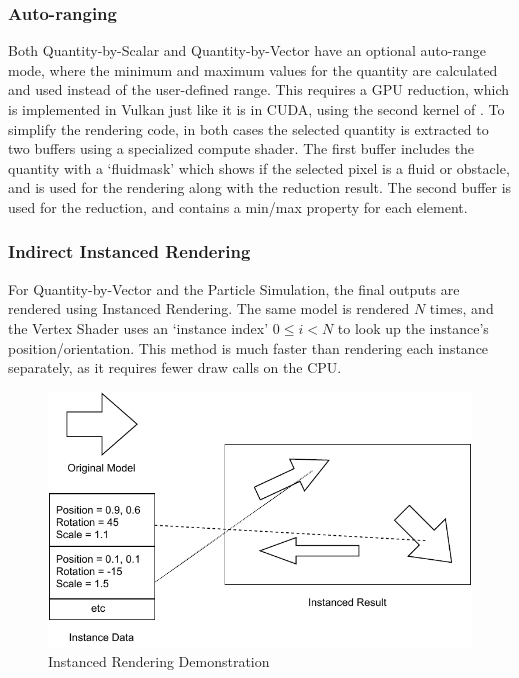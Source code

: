 \subsubsection{Auto-ranging}
Both Quantity-by-Scalar and Quantity-by-Vector have an optional auto-range mode, where the minimum and maximum values for the quantity are calculated and used instead of the user-defined range.
This requires a GPU reduction, which is implemented in Vulkan just like it is in CUDA, using the second kernel of \cite{CUDAParallelReduction}.
To simplify the rendering code, in both cases the selected quantity is extracted to two buffers using a specialized compute shader.
The first buffer includes the quantity with a `fluidmask' which shows if the selected pixel is a fluid or obstacle, and is used for the rendering along with the reduction result.
The second buffer is used for the reduction, and contains a min/max property for each element.%

\subsubsection{Indirect Instanced Rendering}
For Quantity-by-Vector and the Particle Simulation, the final outputs are rendered using Instanced Rendering.
The same model is rendered $N$ times, and the Vertex Shader uses an `instance index' $0 \le i < N$ to look up the instance's position/orientation.
This method is much faster than rendering each instance separately, as it requires fewer draw calls on the CPU.
\begin{figure}[t]
    \centering
    \includegraphics{Ch42Design/figures/FinalReport_InstancedRendering.pdf}
    \caption{Instanced Rendering Demonstration}
    \label{fig:InstancedRendering}
\end{figure}

